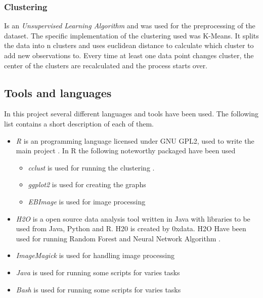 \subsubsection{Clustering}
Is an \emph{Unsupervised Learning Algorithm} and was used for the preprocessing of the dataset. The specific implementation of the clustering used was K-Means. It splits the data into n clusters and uses euclidean distance to calculate which cluster to add new observations to. Every time at least one data point changes cluster, the center of the clusters are recalculated and the process starts over.

\subsection{Tools and languages}
In this project several different languages and tools have been used. The following list contains a short description of each of them. 

\begin{itemize}
	\item \textit{R} is an programming language licensed under GNU GPL2, used to write the main project \citealp{RLanguage}. In R the following noteworthy packaged have been used
		\begin{itemize}
			\item \textit{cclust} is used for running the clustering \cite{cclust}.
			\item \textit{ggplot2} is used for creating the graphs
			\item \textit{EBImage} is used for image processing \cite{EBI}
		\end{itemize}
	\item \textit{H2O} is a open source data analysis tool written in Java with libraries to be used from Java, Python and R. H20 is created by 0xdata. H2O Have been used for running Random Forest and Neural Network Algorithm \cite{H2O}.
	\item \textit{ImageMagick} is used for handling image processing \cite{ImgMag}
	\item \textit{Java} is used for running some scripts for varies tasks
	\item \textit{Bash} is used for running some scripts for varies tasks
\end{itemize}
